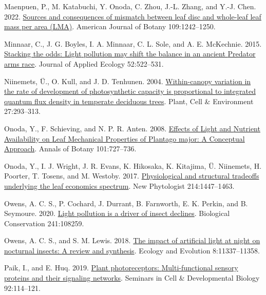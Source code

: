 \documentclass[
  12pt,
  letterpaper,
  DIV=11,
  numbers=noendperiod]{scrartcl}
\newlength{\cslhangindent}
\newlength{\cslentryspacingunit} %
\newenvironment{CSLReferences}[2] %
 {%
  \setlength{\parindent}{0pt}
  \ifodd #1
  \let\oldpar\par
  \def\par{\hangindent=\cslhangindent\oldpar}
  \fi
  \setlength{\parskip}{#2\cslentryspacingunit}
 }%
 {}
\begin{document}
\begin{CSLReferences}{1}{0}
\leavevmode{}%
Maenpuen, P., M. Katabuchi, Y. Onoda, C. Zhou, J.-L. Zhang, and Y.-J.
Chen. 2022. \href{https://doi.org/10.1002/ajb2.16038}{Sources and
consequences of mismatch between leaf disc and whole-leaf leaf mass per
area ({LMA})}. American Journal of Botany 109:1242--1250.

\leavevmode{}%
Minnaar, C., J. G. Boyles, I. A. Minnaar, C. L. Sole, and A. E.
McKechnie. 2015. \href{https://doi.org/10.1111/1365-2664.12381}{Stacking
the odds: {Light} pollution may shift the balance in an ancient
{Predator} arms race}. Journal of Applied Ecology
52:522--531.

\leavevmode{}%
Niinemets, Ü., O. Kull, and J. D. Tenhunen. 2004.
\href{https://doi.org/10.1111/j.1365-3040.2003.01143.x}{Within-canopy
variation in the rate of development of photosynthetic capacity is
proportional to integrated quantum flux density in temperate deciduous
trees}. Plant, Cell \& Environment 27:293--313.

\leavevmode{}%
Onoda, Y., F. Schieving, and N. P. R. Anten. 2008.
\href{https://doi.org/10.1093/aob/mcn013}{Effects of {Light} and
{Nutrient Availability} on {Leaf Mechanical Properties} of {Plantago}
major: {A Conceptual Approach}}. Annals of Botany 101:727--736.

\leavevmode{}%
Onoda, Y., I. J. Wright, J. R. Evans, K. Hikosaka, K. Kitajima, Ü.
Niinemets, H. Poorter, T. Tosens, and M. Westoby. 2017.
\href{https://doi.org/10.1111/nph.14496}{Physiological and structural
tradeoffs underlying the leaf economics spectrum}. New Phytologist
214:1447--1463.

\leavevmode{}%
Owens, A. C. S., P. Cochard, J. Durrant, B. Farnworth, E. K. Perkin, and
B. Seymoure. 2020.
\href{https://doi.org/10.1016/j.biocon.2019.108259}{Light pollution is a
driver of insect declines}. Biological Conservation 241:108259.

\leavevmode{}%
Owens, A. C. S., and S. M. Lewis. 2018.
\href{https://doi.org/10.1002/ece3.4557}{The impact of artificial light
at night on nocturnal insects: {A} review and synthesis}. Ecology and
Evolution 8:11337--11358.

\leavevmode{}%
Paik, I., and E. Huq. 2019.
\href{https://doi.org/10.1016/j.semcdb.2019.03.007}{Plant
photoreceptors: {Multi-functional} sensory proteins and their signaling
networks}. Seminars in Cell \& Developmental Biology 92:114--121.


\end{CSLReferences}
\end{document}
